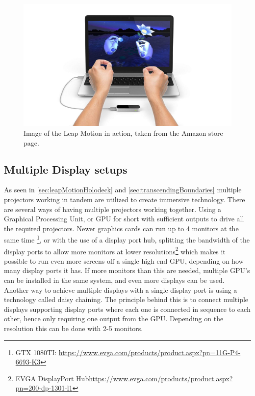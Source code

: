     \begin{figure}[H]
    	\centering
    	\includegraphics[width=0.9\linewidth]{figure/Analysis/leapMotion.jpg}
    	\caption{Image of the Leap Motion in action, taken from the Amazon store page.}
    	\label{fig:leapMotion}
    \end{figure}

\subsection{Multiple Display setups}
As seen in \autoref{sec:leapMotionHolodeck} and \autoref{sec:transcendingBoundaries} multiple projectors working in tandem are utilized to create immersive technology. There are several ways of having multiple projectors working together. Using a Graphical Processing Unit, or GPU for short with sufficient outputs to drive all the required projectors. Newer graphics cards can run up to 4 monitors at the same time \footnote{GTX 1080TI: \url{https://www.evga.com/products/product.aspx?pn=11G-P4-6693-K3}}, or with the use of a display port hub, splitting the bandwidth of the display ports to allow more monitors at lower resolutions\footnote{EVGA DisplayPort Hub\url{https://www.evga.com/products/product.aspx?pn=200-dp-1301-l1}} which makes it possible to run even more screens off a single high end GPU, depending on how many display ports it has. If more monitors than this are needed, multiple GPU's can be installed in the same system, and even more displays can be used. Another way to achieve multiple displays with a single display port is using a technology called daisy chaining. The principle behind this is to connect multiple displays supporting display ports where each one is connected in sequence to each other, hence only requiring one output from the GPU. Depending on the resolution this can be done with 2-5 monitors\cite{displayport}.

